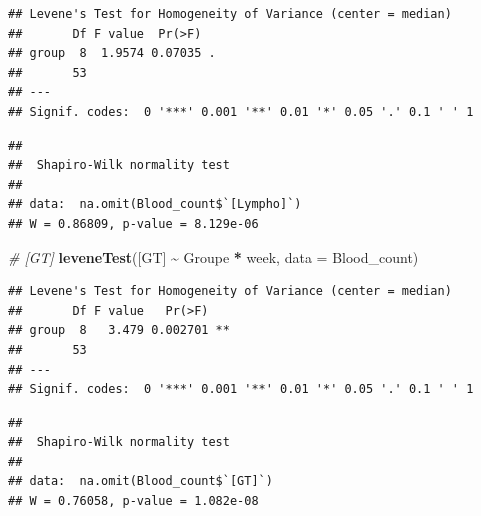 \documentclass[
]{article}
\newenvironment{Shaded}{\begin{snugshade}}{\end{snugshade}}
\newcommand{\AttributeTok}[1]{\textcolor[rgb]{0.13,0.29,0.53}{#1}}
\newcommand{\CommentTok}[1]{\textcolor[rgb]{0.56,0.35,0.01}{\textit{#1}}}
\newcommand{\FunctionTok}[1]{\textcolor[rgb]{0.13,0.29,0.53}{\textbf{#1}}}
\newcommand{\NormalTok}[1]{#1}
\newcommand{\SpecialCharTok}[1]{\textcolor[rgb]{0.81,0.36,0.00}{\textbf{#1}}}
\newcommand{\StringTok}[1]{\textcolor[rgb]{0.31,0.60,0.02}{#1}}
\begin{document}
\begin{verbatim}
## Levene's Test for Homogeneity of Variance (center = median)
##       Df F value  Pr(>F)  
## group  8  1.9574 0.07035 .
##       53                  
## ---
## Signif. codes:  0 '***' 0.001 '**' 0.01 '*' 0.05 '.' 0.1 ' ' 1
\end{verbatim}

\begin{Shaded}
\end{Shaded}

\begin{verbatim}
## 
##  Shapiro-Wilk normality test
## 
## data:  na.omit(Blood_count$`[Lympho]`)
## W = 0.86809, p-value = 8.129e-06
\end{verbatim}

\begin{Shaded}
\begin{Highlighting}[]
\CommentTok{\# [GT]}
\FunctionTok{leveneTest}\NormalTok{(}\StringTok{\textasciigrave{}}\AttributeTok{[GT]}\StringTok{\textasciigrave{}} \SpecialCharTok{\textasciitilde{}}\NormalTok{ Groupe }\SpecialCharTok{*}\NormalTok{ week, }\AttributeTok{data =}\NormalTok{ Blood\_count)}
\end{Highlighting}
\end{Shaded}

\begin{verbatim}
## Levene's Test for Homogeneity of Variance (center = median)
##       Df F value   Pr(>F)   
## group  8   3.479 0.002701 **
##       53                    
## ---
## Signif. codes:  0 '***' 0.001 '**' 0.01 '*' 0.05 '.' 0.1 ' ' 1
\end{verbatim}

\begin{Shaded}
\end{Shaded}

\begin{verbatim}
## 
##  Shapiro-Wilk normality test
## 
## data:  na.omit(Blood_count$`[GT]`)
## W = 0.76058, p-value = 1.082e-08
\end{verbatim}
\end{document}
